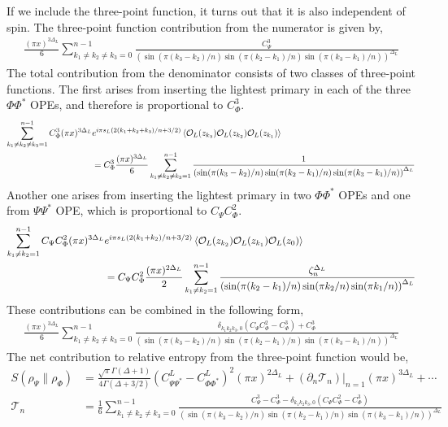 \documentclass[11pt]{article}
\newcommand{\p}{\partial}
\newcommand{\mO}{\mathcal{O}}
\newcommand{\nn}{\nonumber}
\newcommand{\lb}{\left(}
\newcommand{\rb}{\right)}
\begin{document}
  If we include the three-point function, it turns out that it is also independent of spin.
The three-point function contribution from the numerator is given by,
\begin{align}
    \frac{(\pi x)^{3\Delta_L}}{6}\sum_{k_1\neq k_2\neq k_3 =0}^{n-1} \frac{C_\Psi^3}{\lb \sin(\pi (k_3 - k_2)/n) \sin (\pi (k_2 - k_1)/n) \sin(\pi (k_3-k_1)/n)\rb^{\Delta_L}}
\end{align}
The total contribution from the denominator consists of two classes of three-point functions. The first arises from inserting the lightest primary in each of the three $\Phi \Phi^*$ OPEs, and therefore is proportional to $C_\Phi^3$. 
  \begin{align}
     \sum_{k_1 \neq k_2 \neq k_3 = 1}^{n-1} C_\Phi^3(\pi x)^{3\Delta_L}& e^{i\pi s_L(2(k_1 + k_2+k_3)/n + 3/2) }\braket{ \mO_L(z_{k_3})\mO_L(z_{k_2})\mO_L(z_{k_1})} \\
            & = C_\Phi^3\frac{(\pi x)^{3\Delta_L}}{6}\sum_{k_1 \neq k_2 \neq k_3= 1}^{n-1}\frac{1}{\lb \sin(\pi (k_3 - k_2)/n) \sin (\pi (k_2 - k_1)/n) \sin(\pi (k_3-k_1)/n)\rb^{\Delta_L}}
  \end{align}
  Another one arises from inserting the lightest primary in two $\Phi \Phi^*$ OPEs and one from $\Psi \Psi^*$ OPE, which is proportional to $C_\Psi C_\Phi^2$. 
    \begin{align}
       \sum_{k_1 \neq k_2 = 1}^{n-1}C_\Psi C_\Phi^2 (\pi x)^{3\Delta_L}& e^{i\pi s_L(2(k_1 + k_2)/n + 3/2) }\braket{ \mO_L(z_{k_2})\mO_L(z_{k_1})\mO_L(z_{0})} \nn \\ 
       & = C_\Psi C_\Phi^2\frac{(\pi x)^{2\Delta_L}}{2}\sum_{k_1 \neq k_2 = 1}^{n-1}\frac{\zeta_n^{\Delta_L}}{\lb \sin(\pi (k_2 - k_1)/n) \sin (\pi k_2/n) \sin(\pi k_1/n)\rb^{\Delta_L}}
  \end{align}
These contributions can be combined in the following form,
\begin{align}
    \frac{(\pi x)^{3\Delta_L}}{6}\sum_{k_1\neq k_2\neq k_3 =0}^{n-1} \frac{\delta_{k_1k_2k_3,0}\lb C_\Psi C_\Phi^2 - C_\Phi^3 \rb  + C_\Phi^3}{\lb \sin(\pi (k_3 - k_2)/n) \sin (\pi (k_2 - k_1)/n) \sin(\pi (k_3-k_1)/n)\rb^{\Delta_L}}
\end{align}
The net contribution to relative entropy from the three-point function would be,
\begin{align}
    S(\rho_\Psi \| \rho_\Phi) &= \frac{\sqrt{\pi}\Gamma(\Delta+1)}{4\Gamma(\Delta+3/2)}(C^L_{\Psi\Psi^*}-C^L_{\Phi\Phi^*})^2 (\pi x)^{2\Delta_L}+(\p_n \mathcal{T}_n )|_{n=1}(\pi x)^{3\Delta_L} +\cdots  \\
    \mathcal{T}_n &= \frac{1}{6}\sum_{k_1\neq k_2 \neq k_3 = 0}^{n-1} \frac{C_\Psi^3 - C_\Phi^3 - \delta_{k_1k_2k_3,0}(C_\Psi C_\Phi^2 - C_\Phi^3)}{\lb \sin(\pi (k_3 - k_2)/n) \sin (\pi (k_2 - k_1)/n) \sin(\pi (k_3-k_1)/n)\rb^{\Delta_L}}
\end{align}
\end{document}
